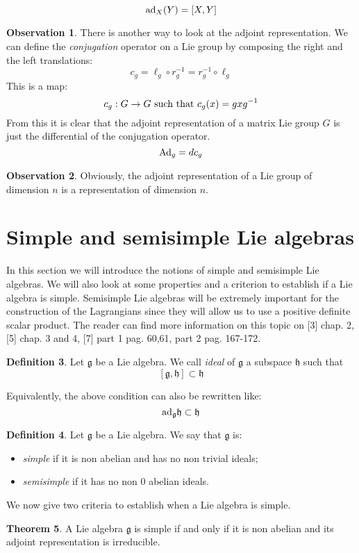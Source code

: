 \documentclass[12pt,a4paper]{report}
\theoremstyle{definition}
\newtheorem{Def}{Definition}[chapter]
\theoremstyle{Theorem}
\newtheorem{Theo}[Def]{Theorem}
\theoremstyle{definition}
\theoremstyle{definition}
\newtheorem{Obs}[Def]{Observation}
\begin{document}
	$$\hbox{ad}_X(Y)=[X,Y]$$
	\begin{Obs}
		There is another way to look at the adjoint representation. We can define the \textit{conjugation} operator on a Lie group by composing the right and the left translations:
		$$c_g=\ell_g\circ r_g^{-1}=r_g^{-1}\circ \ell_g$$
		This is a map:
		$$c_g:G\rightarrow G\hbox{ such that } c_g(x)=gxg^{-1}$$
		From this it is clear that the adjoint representation of a matrix Lie group $G$ is just the differential of the conjugation operator.
		$$\hbox{Ad}_g=dc_g$$
	\end{Obs}
	\begin{Obs}
		Obviously, the adjoint representation of a Lie group of dimension $n$ is a representation of dimension $n$.
	\end{Obs}
	\section{Simple and semisimple Lie algebras}
	In this section we will introduce the notions of simple and semisimple Lie algebras. We will also look at some properties and a criterion to establish if a Lie algebra is simple. Semisimple Lie algebras will be extremely important for the construction of the Lagrangians since they will allow us to use a positive definite scalar product. The reader can find more information on this topic on [3] chap. 2, [5] chap. 3 and 4, [7] part 1 pag. 60,61, part 2 pag. 167-172.
	\begin{Def}
		Let $\mathfrak{g}$ be a Lie algebra. We call \textit{ideal} of $\mathfrak{g}$ a subspace $\mathfrak{h}$ such that 
		$$[\mathfrak{g},\mathfrak{h}]\subset\mathfrak{h}$$
	\end{Def}
	Equivalently, the above condition can also be rewritten like:
	$$\hbox{ad}_\mathfrak{g}\mathfrak{h}\subset\mathfrak{h}$$
	\begin{Def}
		Let $\mathfrak{g}$ be a Lie algebra. We say that $\mathfrak{g}$ is:
		\begin{itemize}
			\item \textit{simple} if it is non abelian and has no non trivial ideals;
			\item \textit{semisimple} if it has no non 0 abelian ideals.
		\end{itemize}
	\end{Def}
	We now give two criteria to establish when a Lie algebra is simple.
	\begin{Theo}
		A Lie algebra $\mathfrak{g}$ is simple if and only if it is non abelian and its adjoint representation is irreducible.
	\end{Theo}
\end{document}
